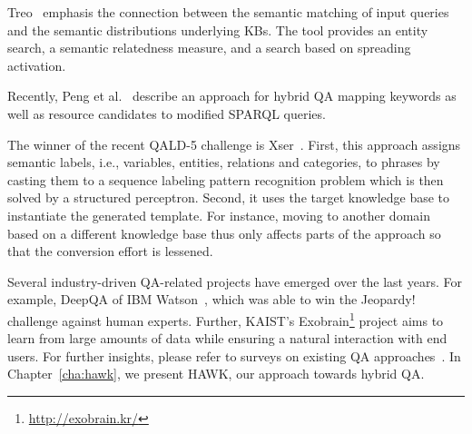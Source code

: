 {Treo}~\cite{treo} emphasis the connection between the semantic matching of input queries and the semantic distributions underlying \ac{KB}s.
The tool provides an entity search, a semantic relatedness measure, and a search based on spreading activation.

Recently, Peng et al.~\cite{DBLP:journals/corr/PengZZ14} describe an approach for hybrid \ac{QA} mapping keywords as well as resource candidates to modified SPARQL queries. 

The winner of the recent \ac{QALD}-5 challenge is Xser~\cite{xu2014xser}.
First, this approach assigns semantic labels, i.e., variables, entities, relations and categories, to phrases by casting them to a sequence labeling pattern recognition problem which is then solved by a structured perceptron.
Second, it uses the target knowledge base to instantiate the generated template.
For instance, moving to another domain based on a different knowledge base thus only affects parts of the approach so that the conversion effort is lessened.


Several industry-driven \ac{QA}-related projects have emerged over the last years. 
For example, DeepQA of IBM Watson~\cite{watson}, which was able to win the Jeopardy! challenge against human experts. 
Further, {KAIST's Exobrain\footnote{\url{http://exobrain.kr/}}} project aims to learn from large amounts of data while ensuring a natural interaction with end users. 
For further insights, please refer to surveys on existing \ac{QA} approaches~\cite{qasurvey,Kolomiyets:2011,DBLP:journals/semweb/LopezUSM11}.
In Chapter~\ref{cha:hawk}, we present HAWK, our approach towards hybrid \ac{QA}. 



